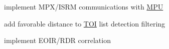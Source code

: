 
\begin{DoxyRefList}
\item[Class \mbox{\hyperlink{class_m_p_u}{M\+PU}} ]\label{todo__todo000001}%
%
implement M\+P\+X/\+I\+S\+RM communications with \mbox{\hyperlink{class_m_p_u}{M\+PU}}  
\item[Class \mbox{\hyperlink{class_m_p_x}{M\+PX}} ]\label{todo__todo000003}%
%
add favorable distance to \mbox{\hyperlink{class_t_o_i}{T\+OI}} list detection filtering  
\item[Class \mbox{\hyperlink{class_i_s_r_m}{I\+S\+RM}} ]\label{todo__todo000008}%
%
implement E\+O\+I\+R/\+R\+DR correlation 
\end{DoxyRefList}
